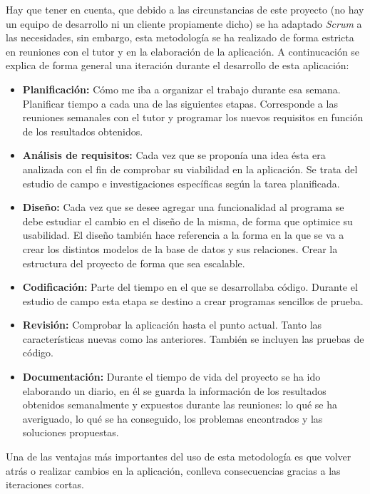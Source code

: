 Hay que tener en cuenta, que debido a las circunstancias de este proyecto (no hay un equipo de desarrollo ni un cliente propiamente dicho) se ha adaptado \emph{Scrum} a las necesidades, sin embargo, esta metodología se ha realizado de forma estricta en reuniones con el tutor y en la elaboración de la aplicación. A continucación se explica de forma general una iteración durante el desarrollo de esta aplicación:
\begin{itemize}
	\item \textbf{Planificación:} Cómo me iba a organizar el trabajo durante esa semana. Planificar tiempo a cada una de las siguientes etapas. Corresponde a las reuniones semanales con el tutor y programar los nuevos requisitos en función de los resultados obtenidos.
	\item \textbf{Análisis de requisitos:} Cada vez que se proponía una idea ésta era analizada con el fin de comprobar su viabilidad en la aplicación. Se trata del estudio de campo e investigaciones específicas según la tarea planificada.
	\item \textbf{Diseño:} Cada vez que se desee agregar una funcionalidad al programa se debe estudiar el cambio en el diseño de la misma, de forma que optimice su usabilidad. El diseño también hace referencia a la forma en la que se va a crear los distintos modelos de la base de datos y sus relaciones. Crear la estructura del proyecto de forma que sea escalable.
	\item \textbf{Codificación:} Parte del tiempo en el que se desarrollaba código. Durante el estudio de campo esta etapa se destino a crear programas sencillos de prueba.
	\item \textbf{Revisión:} Comprobar la aplicación hasta el punto actual. Tanto las características nuevas como las anteriores. También se incluyen las pruebas de código.
	\item \textbf{Documentación:} Durante el tiempo de vida del proyecto se ha ido elaborando un diario, en él se guarda la información de los resultados obtenidos semanalmente y expuestos durante las reuniones: lo qué se ha averiguado, lo qué se ha conseguido, los problemas encontrados y las soluciones propuestas.
\end{itemize}

Una de las ventajas más importantes del uso de esta metodología es que volver atrás o realizar cambios en la aplicación, conlleva consecuencias gracias a las iteraciones cortas. \\


\vspace*{0.2in}
